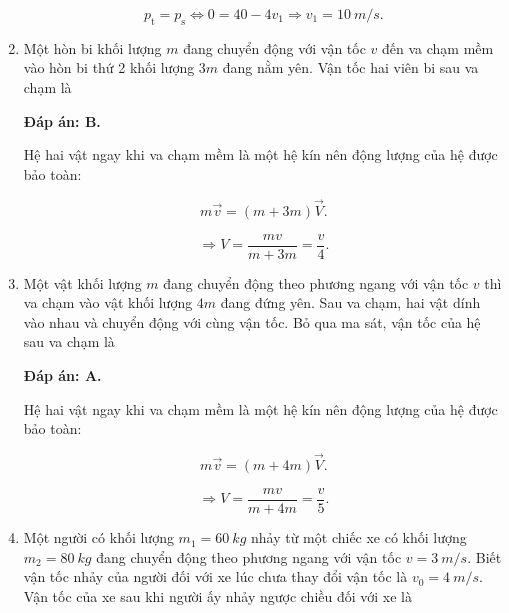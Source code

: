 \begin{enumerate}[label=\bfseries Câu \arabic*:]
{		$$p_\text{t} = p_\text{s} \Leftrightarrow 0 = 40 - 4v_1 \Rightarrow v_1 = \SI{10}{m/s}.$$ 
	}
	\item {}
	
	
	{Một hòn bi khối lượng $m$ đang chuyển động với vận tốc $v$ đến va chạm mềm vào hòn bi thứ 2 khối lượng $3m$ đang nằm yên. Vận tốc hai viên bi sau va chạm là
	}
	
	\hideall
	{	
		\textbf{Đáp án: B.}
		
		Hệ hai vật ngay khi va chạm mềm là một hệ kín nên động lượng của hệ được bảo toàn:
		
		$$m\vec v = (m+ 3m)\vec V.$$
		
		$$ \Rightarrow V = \dfrac{mv}{m + 3m} = \dfrac{v}{4}.$$
	}
	\item {}
	
	
	{Một vật khối lượng $m$ đang chuyển động theo phương ngang với vận tốc $v$ thì va chạm vào vật khối lượng $4m$ đang đứng yên. Sau va chạm, hai vật dính vào nhau và chuyển động với cùng vận tốc. Bỏ qua ma sát, vận tốc của hệ sau va chạm là 
	}
	
	\hideall
	{	
		\textbf{Đáp án: A.}
		
		Hệ hai vật ngay khi va chạm mềm là một hệ kín nên động lượng của hệ được bảo toàn:
		
		$$m\vec v = (m+ 4m)\vec V.$$
		
		$$ \Rightarrow V = \dfrac{mv}{m + 4m} = \dfrac{v}{5}.$$
	}
		\item {}
	
	
	{Một người có khối lượng $m_1=\SI{60}{kg}$ nhảy từ một chiếc xe có khối lượng $m_2 = \SI{80}{kg}$ đang chuyển động theo phương ngang với vận tốc $v = \SI{3}{m/s}$. Biết vận tốc nhảy của người đối với xe lúc chưa thay đổi vận tốc là $v_0 = \SI{4}{m/s}$. Vận tốc của xe sau khi người ấy nhảy ngược chiều đối với xe là
	}
	

\end{enumerate}
